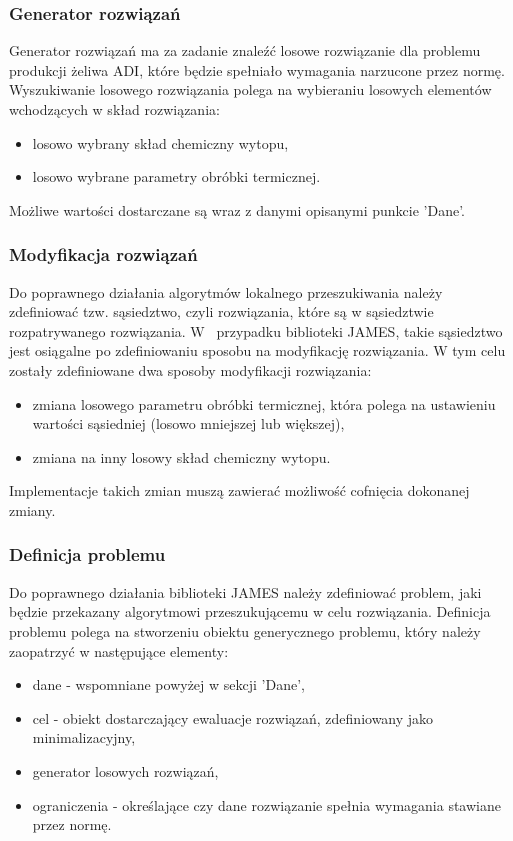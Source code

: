 \subsubsection{Generator rozwiązań}
Generator rozwiązań ma za zadanie znaleźć losowe rozwiązanie dla problemu produkcji żeliwa ADI, które będzie spełniało wymagania narzucone przez normę. Wyszukiwanie losowego rozwiązania polega na wybieraniu losowych elementów wchodzących w skład rozwiązania:
\begin{itemize}
    \item losowo wybrany skład chemiczny wytopu, 
    \item losowo wybrane parametry obróbki termicznej.
\end{itemize}
Możliwe wartości dostarczane są wraz z danymi opisanymi punkcie 'Dane'.

\subsubsection{Modyfikacja rozwiązań}\label{sec:neighs}
Do poprawnego działania algorytmów lokalnego przeszukiwania należy zdefiniować tzw. sąsiedztwo, czyli rozwiązania, które są w sąsiedztwie rozpatrywanego rozwiązania. W~ przypadku biblioteki JAMES, takie sąsiedztwo jest osiągalne po zdefiniowaniu sposobu na modyfikację rozwiązania. W tym celu zostały zdefiniowane dwa sposoby modyfikacji rozwiązania:
\begin{itemize}
    \item zmiana losowego parametru obróbki termicznej, która polega na ustawieniu wartości sąsiedniej (losowo mniejszej lub większej),
    \item zmiana na inny losowy skład chemiczny wytopu.
\end{itemize}
Implementacje takich zmian muszą zawierać możliwość cofnięcia dokonanej zmiany.

\subsubsection{Definicja problemu}
Do poprawnego działania biblioteki JAMES należy zdefiniować problem, jaki będzie przekazany algorytmowi przeszukującemu w celu rozwiązania. Definicja problemu polega na stworzeniu obiektu generycznego problemu, który należy zaopatrzyć w następujące elementy:
\begin{itemize}
    \item dane - wspomniane powyżej w sekcji 'Dane',
    \item cel - obiekt dostarczający ewaluacje rozwiązań, zdefiniowany jako minimalizacyjny,
    \item generator losowych rozwiązań,
    \item ograniczenia - określające czy dane rozwiązanie spełnia wymagania stawiane przez normę.
\end{itemize}

